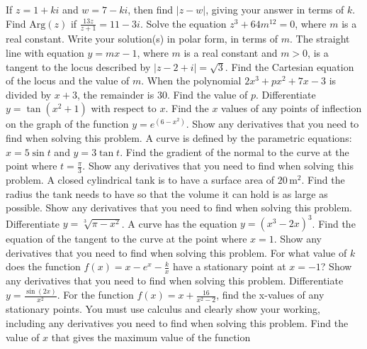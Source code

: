 \documentclass[12pt,addpoints]{exam}
\begin{document}
\begin{questions}
\fillwithlines{5cm}
\question[5] If \( z = 1 + ki \) and \( w = 7 - ki \), then find \( |z - w| \), giving your answer in terms of \( k \).
\fillwithlines{5cm}
\question[5] Find \( \text{Arg}(z) \) if \( \frac{13z}{z+1} = 11 - 3i \).
\fillwithlines{5cm}
\question[5] Solve the equation \( z^3 + 64m^{12} = 0 \), where \( m \) is a real constant. Write your solution(s) in polar form, in terms of \( m \).
\fillwithlines{5cm}
\question[5] The straight line with equation \( y = mx - 1 \), where \( m \) is a real constant and \( m > 0 \), is a tangent to the locus described by \( |z - 2 + i| = \sqrt{3} \). Find the Cartesian equation of the locus and the value of \( m \).
\fillwithlines{5cm}
\question[5] When the polynomial \(2x^3 + px^2 + 7x - 3\) is divided by \(x + 3\), the remainder is 30. Find the value of \(p\).
\fillwithlines{5cm}
\question[5] Differentiate \( y = \tan(x^2 + 1) \) with respect to \( x \).
\fillwithlines{5cm}
\question[5] Find the \( x \) values of any points of inflection on the graph of the function \( y = e^{(6 - x^2)} \). Show any derivatives that you need to find when solving this problem.
\fillwithlines{5cm}
\question[5] A curve is defined by the parametric equations: \( x = 5 \sin t \) and \( y = 3 \tan t \). Find the gradient of the normal to the curve at the point where \( t = \frac{\pi}{3} \). Show any derivatives that you need to find when solving this problem.
\fillwithlines{5cm}
\question[5] A closed cylindrical tank is to have a surface area of \(20 \, \text{m}^2\). Find the radius the tank needs to have so that the volume it can hold is as large as possible. Show any derivatives that you need to find when solving this problem.
\fillwithlines{5cm}
\question[5] Differentiate \( y = \sqrt[3]{\pi - x^2} \).
\fillwithlines{5cm}
\question[5] A curve has the equation \( y = (x^3 - 2x)^3 \). Find the equation of the tangent to the curve at the point where \( x = 1 \). Show any derivatives that you need to find when solving this problem.
\fillwithlines{5cm}
\question[5] For what value of \( k \) does the function \( f(x) = x - e^x - \frac{k}{x} \) have a stationary point at \( x = -1 \)? Show any derivatives that you need to find when solving this problem.
\fillwithlines{5cm}
\question[5] Differentiate \( y = \frac{\sin(2x)}{x^2} \).
\fillwithlines{5cm}
\question[5] For the function \( f(x) = x + \frac{16}{x^2 - 2} \), find the x-values of any stationary points. You must use calculus and clearly show your working, including any derivatives you need to find when solving this problem.
\fillwithlines{5cm}
\question[5] Find the value of \( x \) that gives the maximum value of the function


\end{questions}
\end{document}
